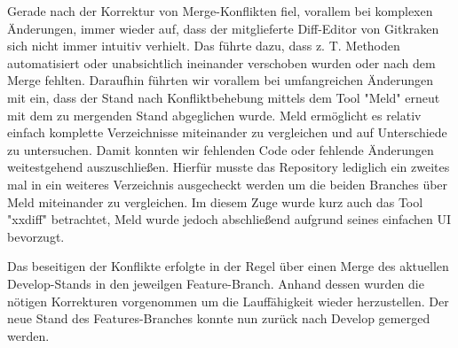 Gerade nach der Korrektur von Merge-Konflikten fiel, vorallem bei komplexen Änderungen, immer wieder auf, dass der mitglieferte Diff-Editor von Gitkraken sich nicht immer intuitiv verhielt. Das führte dazu, dass z. T. Methoden automatisiert oder unabsichtlich ineinander verschoben wurden oder nach dem Merge fehlten. Daraufhin führten wir vorallem bei umfangreichen Änderungen mit ein, dass der Stand nach Konfliktbehebung mittels dem Tool "Meld" erneut mit dem zu mergenden Stand abgeglichen wurde. Meld ermöglicht es relativ einfach komplette Verzeichnisse miteinander zu vergleichen und auf Unterschiede zu untersuchen. Damit konnten wir fehlenden Code oder fehlende Änderungen weitestgehend auszuschließen. Hierfür musste das Repository lediglich ein zweites mal in ein weiteres Verzeichnis ausgecheckt werden um die beiden Branches über Meld miteinander zu vergleichen. Im diesem Zuge wurde kurz auch das Tool "xxdiff" betrachtet, Meld wurde jedoch abschließend aufgrund seines einfachen UI bevorzugt. 

Das beseitigen der Konflikte erfolgte in der Regel über einen Merge des aktuellen Develop-Stands in den jeweilgen Feature-Branch. Anhand dessen wurden die nötigen Korrekturen vorgenommen um die Lauffähigkeit wieder herzustellen. Der neue Stand des Features-Branches konnte nun zurück nach Develop gemerged werden. 
